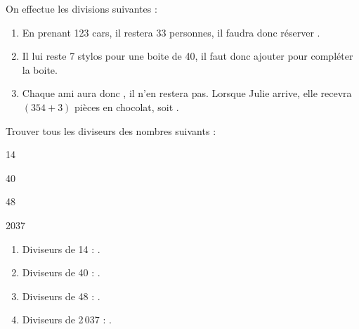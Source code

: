 \begin{Maquette}[Fiche,CorrigeFin,Colonnes=2]{}
\begin{multicols}{2}
      \begin{Solution}
         On effectue les divisions suivantes : \par 
         {\small {} \hfill {} \hfill {}}
         \begin{enumerate}
            \item En prenant 123 cars, il restera 33 personnes, il faudra donc réserver .
            \item Il lui reste 7 stylos pour une boite de 40, il faut donc ajouter  pour compléter la boite.
            \item Chaque ami aura donc , il n'en restera pas. Lorsque Julie arrive, elle recevra $(354+3)$ pièces en chocolat, soit .
         \end{enumerate}
      \end{Solution}
      
  
      \begin{exercice} %
         Trouver tous les diviseurs des nombres suivants :
         \begin{colenumerate}
            \item 14
            \item 40
            \item 48
            \item \num{2037}
         \end{colenumerate}
      \end{exercice}

      \begin{Solution}
         \begin{enumerate}
            \item Diviseurs de 14 : .
            \item Diviseurs de 40 : .
            \item Diviseurs de 48 : .
            \item Diviseurs de 2\,037 : .
         \end{enumerate}
      \end{Solution}
      

\end{multicols}
\end{Maquette}
